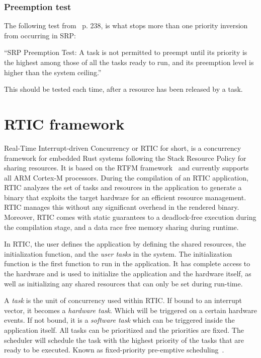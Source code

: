 \subsubsection{Preemption test}
The following test from~\cite{hardrealtimecomputingsystems} p. 238, is what
stops more than one priority inversion from occurring in SRP:
\begin{displayquote}
    “SRP Preemption Test: A task is not permitted to preempt until its priority
    is the highest among those of all the tasks ready to run, and its preemption
    level is higher than the system ceiling.”
\end{displayquote}
This should be tested each time, after a resource has been released by a task.

\section{RTIC framework}
Real-Time Interrupt-driven Concurrency or RTIC for short, is a concurrency
framework for embedded Rust systems following the Stack Resource Policy for
sharing resources. It is based on the RTFM framework~\cite{rtfm} and currently
supports all ARM Cortex-M processors. During the compilation of an RTIC
application, RTIC analyzes the set of tasks and resources in the application to
generate a binary that exploits the target hardware for an efficient resource
management. RTIC manages this without any significant overhead in the rendered
binary. Moreover, RTIC comes with static guarantees to a deadlock-free
execution during the compilation stage, and a data race free memory sharing
during runtime.

In RTIC, the user defines the application by defining the shared resources, the
initialization function, and the \emph{user tasks} in the system. The
initialization function is the first function to run in the application. It has
complete access to the hardware and is used to initialize the application and
the hardware itself, as well as initializing any shared resources that can only
be set during run-time.

A \emph{task} is the unit of concurrency used within RTIC\@. If bound to an
interrupt vector, it becomes a \emph{hardware task}. Which will be
triggered on a certain hardware events. If not bound, it is a \emph{software
task} which can be triggered inside the application itself. All tasks can
be prioritized and the priorities are fixed. The scheduler will schedule the
task with the highest priority of the tasks that are ready to be executed.
Known as fixed-priority pre-emptive scheduling~\cite{fixedpriorityhistory}.


